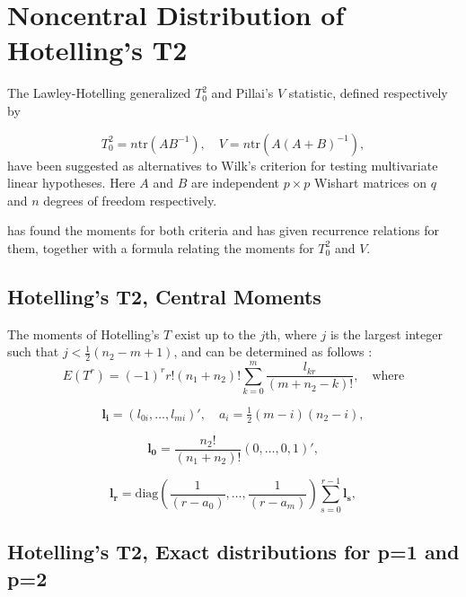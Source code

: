 \newpage
\section{Noncentral Distribution of Hotelling's T2}

The Lawley-Hotelling generalized $T_0^2$ and Pillai's $V$ statistic, defined respectively by

\begin{equation}
	T_0^2 = n \text{tr} (AB^{-1}), \quad V = n \text{tr} (A(A+B)^{-1}),
\end{equation}
have been suggested as alternatives to Wilk's criterion for testing multivariate linear hypotheses. Here $A$ and $B$ are independent $p \times p$ Wishart matrices on $q$ and $n$ degrees of freedom respectively.

\cite{Davis_1968, Davis_1970b} has found the moments for both criteria and has given recurrence relations for them, together with a formula relating the moments for $T_0^2$ and  $V$.



\subsection{Hotelling's T2, Central Moments}
The moments of Hotelling's $T$ exist up to the $j$th, where $j$ is the largest integer such that $j< \tfrac{1}{2} (n_2-m+1)$, and  can be determined as follows \citep{Davis_1968}:
\begin{equation}
	E(T^r) = (-1)^r r! (n_1+n_2)! \sum_{k=0}^m \frac{l_{kr}}{(m+n_2-k)!}, \quad \text{where} \label{eq:HotellingT2NullMoments}
\end{equation}

\begin{equation}
	\boldsymbol{l_i} = (l_{0i},\ldots,l_{mi})', \quad a_i = \tfrac{1}{2} (m-i)(n_2-i),
\end{equation}

\begin{equation}
	\boldsymbol{l_0} = \frac{n_2!}{(n_1+n_2)!} (0,\ldots,0,1)',
\end{equation}

\begin{equation}
	\boldsymbol{l_r} = \text{diag} \left( \frac{1}{(r-a_0)},\ldots,\frac{1}{(r-a_m)} \right) \sum_{s=0}^{r-1} \boldsymbol{l_{s}},
\end{equation}

\vpara




\subsection{Hotelling's T2, Exact distributions for p=1 and p=2}


